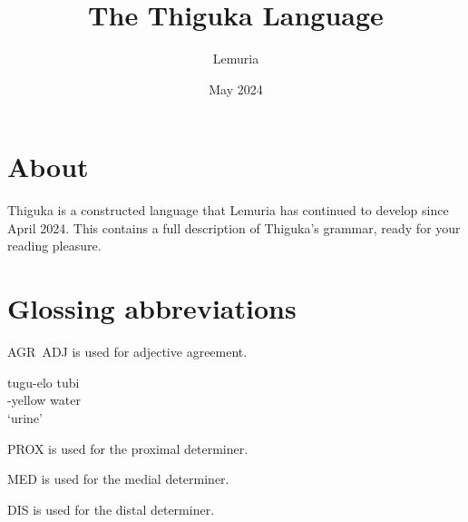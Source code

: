 \documentclass{thiguka}
\title{The Thiguka Language}
\date{May 2024}
\author{Lemuria}
\begin{document}
\maketitle

\newpage

\thigukacopyright{}

\section*{About}
Thiguka is a constructed language that Lemuria has continued to develop since April 2024.
This contains a full description of Thiguka's grammar, ready for your reading pleasure.

\section*{Glossing abbreviations}

AGR~ADJ is used for adjective agreement.
\begin{exe}
    \ex{} \gll{}tu\textapprox{}gu-elo tubi\\
    \agradj{}-yellow water\\
    \glt{}`urine'
\end{exe}

PROX is used for the proximal determiner.

MED is used for the medial determiner.

DIS is used for the distal determiner.

\newpage

\tableofcontents






\end{document}
